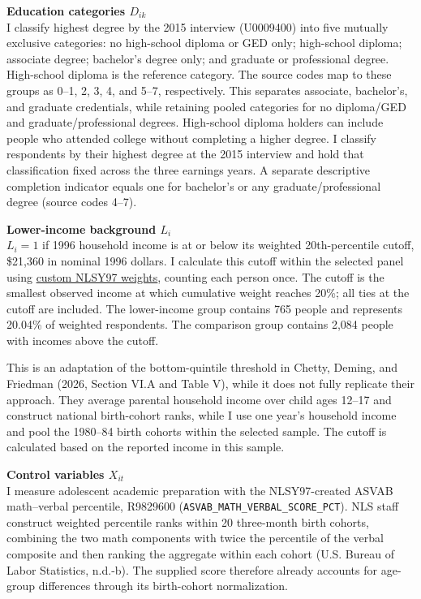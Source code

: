 \documentclass[12pt,letterpaper]{article}
\begin{document}
\textbf{Education categories $D_{ik}$}\\
I classify highest degree by the 2015 interview (U0009400) into five mutually exclusive
categories: no high-school diploma or GED only; high-school diploma; associate
degree; bachelor's degree only; and graduate or professional degree. High-school
diploma is the reference category. The source codes map to these groups as
0--1, 2, 3, 4, and 5--7, respectively. This separates associate, bachelor's, and
graduate credentials, while retaining pooled categories for no diploma/GED and
graduate/professional degrees. High-school diploma holders can include people who
attended college without completing a higher degree. I classify respondents by their
highest degree at the 2015 interview and hold that classification fixed across the
three earnings years. A separate descriptive completion indicator
equals one for bachelor's or any graduate/professional degree (source codes 4--7).\newline

\textbf{Lower-income background $L_i$}\\
$L_i=1$ if 1996 household income is at or below its weighted 20th-percentile cutoff,
\$21,360 in nominal 1996 dollars. I calculate this cutoff within the selected panel using
\href{https://www.nlsinfo.org/content/weights/nlsy97}{custom NLSY97 weights}, counting
each person once. The cutoff is the smallest observed income at which cumulative
weight reaches 20\%; all ties at the cutoff are included. The lower-income group
contains 765 people and represents 20.04\% of weighted respondents. The comparison
group contains 2,084 people with incomes above the cutoff.\newline

This is an adaptation of the bottom-quintile threshold in Chetty, Deming, and
Friedman (2026, Section VI.A and Table V), while it does not fully replicate 
their approach. They average parental household income over child ages 12--17 
and construct national birth-cohort ranks, while I use one year's household 
income and pool the 1980--84 birth cohorts within the selected sample. The cutoff 
is calculated based on the reported income in this sample.\newline

\textbf{Control variables $X_{it}$}\\
I measure adolescent academic preparation with the NLSY97-created ASVAB
math--verbal percentile, R9829600
(\texttt{ASVAB\_MATH\_VERBAL\_SCORE\_PCT}). NLS staff construct weighted 
percentile ranks within 20 three-month birth cohorts, combining the two math 
components with twice the percentile of the verbal composite and then ranking 
the aggregate within each cohort (U.S. Bureau of Labor Statistics, n.d.-b). 
The supplied score therefore already accounts for age-group differences through
its birth-cohort normalization.\newline
\end{document}
